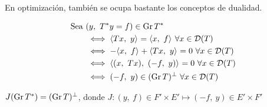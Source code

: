 En optimización, también se ocupa bastante los conceptos de dualidad.

\begin{note}

\begin{align*}
\text{Sea } &(y,\ T\adj y = f) \in \gr T\adj \\
&\iff \prodint[]{Tx}{y} = \prodint[]{x}{f} \ \forall x \in \cd(T) \\
&\iff -\prodint[]{x}{f} + \prodint[]{Tx}{y} = 0 \ \forall x \in \cd(T) \\
&\iff  \prodint[]{(x,\ Tx)}{(-f,\ y)}  = 0 \ \forall x \in \cd(T) \\
&\iff  (-f,\ y) \in (\gr T)\ort  \ \forall x \in \cd(T) 
\end{align*}

$J(\gr T\adj) = (\gr T)\ort $, donde $J: (y,\ f) \in  F' \times E' \mapsto (-f,\ y) \in E' \times F'$

\end{note}












